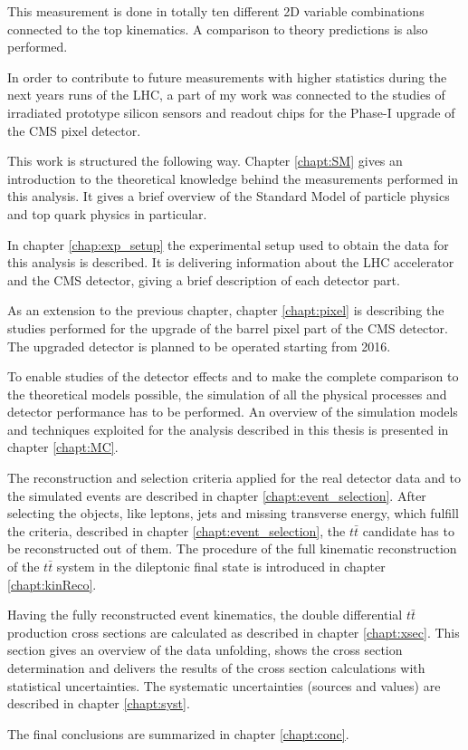 This measurement is done in totally ten different 2D variable combinations
connected to the top kinematics. A comparison to theory predictions is also performed.

In order to contribute to future measurements with higher statistics during
the next years runs of the LHC, a part of my work was connected to the studies of irradiated
prototype silicon sensors and readout chips for the Phase-I upgrade of the CMS pixel detector.

This work is structured the following way. Chapter \ref{chapt:SM} gives an introduction to the theoretical
knowledge behind the measurements performed in this analysis. It gives a brief overview of the Standard
Model of particle physics and top quark physics in particular.

In chapter \ref{chap:exp_setup} the experimental setup used to obtain the data for this analysis is described.
It is delivering information about the LHC accelerator and the CMS detector, giving a brief description of each detector part.

As an extension to the previous chapter, chapter \ref{chapt:pixel} is describing the studies performed for the
upgrade of the barrel pixel part of the CMS detector. The upgraded detector is planned to be operated starting from 2016.

To enable studies of the detector effects and to make the complete comparison to the theoretical models possible,
the simulation of all the physical processes and detector performance has to be performed. An overview of the simulation
models and techniques exploited for the analysis described in this thesis is presented in chapter \ref{chapt:MC}.

The reconstruction and selection criteria applied for the real detector data and to the simulated events are described
in chapter \ref{chapt:event_selection}. After selecting the objects, like leptons, jets and missing transverse energy, which 
fulfill the criteria, described in chapter \ref{chapt:event_selection}, the $t\bar{t}$ candidate has to be reconstructed out
of them. The procedure of the full kinematic reconstruction of the $t\bar{t}$ system in the dileptonic final state is introduced
in chapter \ref{chapt:kinReco}.

Having the fully reconstructed event kinematics, the double differential $t\bar{t}$ production cross sections are calculated
as described in chapter \ref{chapt:xsec}. This section gives an overview of the data unfolding, shows the cross section determination 
and delivers the results of the cross section calculations with statistical uncertainties. The systematic uncertainties (sources and 
values) are described in chapter \ref{chapt:syst}.

The final conclusions are summarized in chapter \ref{chapt:conc}.